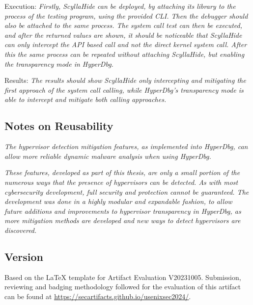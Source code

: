\begin{compactdesc}
\begin{asparadesc}
        \item[Execution:]  \textit{Firstly, ScyllaHide can be deployed, by attaching its library to the process of the testing program, using the provided CLI. Then the debugger should also be attached to the same 
        process. The system call test can then be executed, and after the returned values are shown, it should be noticeable  that ScyllaHide can only intercept the API based call and not the direct kernel system call.
        After this the same process can be repeated without attaching ScyllaHide, but enabling the transparency mode in HyperDbg.}
        
        \item[Results:] \textit{The results should show ScyllaHide only intercepting and mitigating the first approach of the system call calling, while HyperDbg's transparency mode is able to intercept and mitigate both
        calling approaches.}
    \end{asparadesc}

\end{compactdesc}

\subsection{Notes on Reusability}
\label{sec:reuse}

\textit{The hypervisor detection mitigation features, as implemented into HyperDbg, can allow more reliable dynamic malware analysis when using HyperDbg.}

\textit{These features, developed as part of this thesis, are only a small portion
of the numerous ways that the presence of hypervisors can be detected. As with most cybersecurity development, 
full security and protection cannot be guaranteed. The development was done in a highly modular and expandable fashion, 
to allow future additions and improvements to hypervisor transparency in HyperDbg, as more mitigation methods are developed and new ways to detect hypervisors are discovered.}


\subsection{Version}
Based on the LaTeX template for Artifact Evaluation V20231005. Submission,
reviewing and badging methodology followed for the evaluation of this artifact
can be found at \url{https://secartifacts.github.io/usenixsec2024/}.